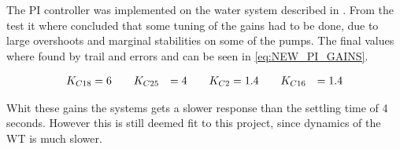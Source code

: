 The PI controller was implemented on the water system described in . From the test it where concluded that some tuning of the gains had to be done, due to large overshoots and marginal stabilities on some of the pumps. The final values where found by trail and errors and can be seen in \eqref{eq:NEW_PI_GAINS}. 

\begin{equation}
\centering
	\begin{split}
	K_{C18} &= 6 \hspace{20pt} K_{C25} &= 4 \hspace{20pt} K_{C2} &= 1.4 \hspace{20pt} K_{C16} &= 1.4
	\end{split}
	\label{eq:NEW_PI_GAINS}
\end{equation}

Whit these gains the systems gets a slower response than the settling time of 4 seconds. However this is still deemed fit to this project, since dynamics of the WT is much slower.